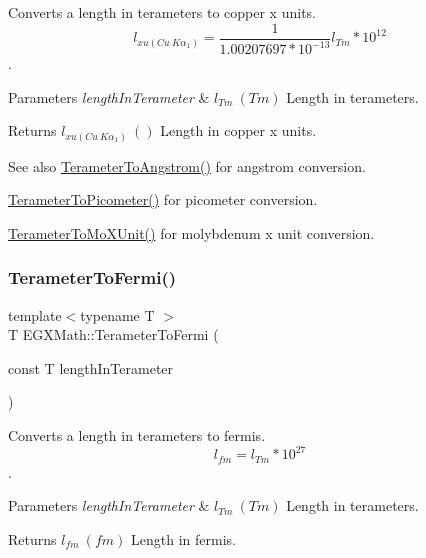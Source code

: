 Converts a length in terameters to copper x units. \[ l_{xu(Cu\ K\alpha_1)}= \frac{1}{1.00207697*10^{-13}} l_{Tm} * 10^{12}\]. 


\begin{DoxyParams}{Parameters}
{\em length\+In\+Terameter} & $ l_{Tm}\ (Tm)$ Length in terameters. \\
\hline
\end{DoxyParams}
\begin{DoxyReturn}{Returns}
$ l_{xu(Cu\ K\alpha_1)}\ ()$ Length in copper x units. 
\end{DoxyReturn}
\begin{DoxySeeAlso}{See also}
\mbox{\hyperlink{group___e_g_x_math-_conversions-_length_conversions-_s_i-_terameter-_non-_s_i_gaab75399e224bea4ea7ddb8bf5f557ee0}{Terameter\+To\+Angstrom()}} for angstrom conversion. 

\mbox{\hyperlink{group___e_g_x_math-_conversions-_length_conversions-_s_i-_terameter-_s_i_ga131f3ccf4db05a31f5bd5c9487da9a4e}{Terameter\+To\+Picometer()}} for picometer conversion. 

\mbox{\hyperlink{group___e_g_x_math-_conversions-_length_conversions-_s_i-_terameter-_non-_s_i_ga391bcf9b529c2e20f2773c699bb0197a}{Terameter\+To\+Mo\+X\+Unit()}} for molybdenum x unit conversion. 
\end{DoxySeeAlso}
\mbox{\label{group___e_g_x_math-_conversions-_length_conversions-_s_i-_terameter-_non-_s_i_ga5bf639553e4b6e8520f9345def06e492}} 
\subsubsection{\texorpdfstring{Terameter\+To\+Fermi()}{TerameterToFermi()}}
{\footnotesize\ttfamily template$<$typename T $>$ \\
T E\+G\+X\+Math\+::\+Terameter\+To\+Fermi (\begin{DoxyParamCaption}\item[{const T}]{length\+In\+Terameter }\end{DoxyParamCaption})}



Converts a length in terameters to fermis. \[ l_{fm}=l_{Tm} * 10^{27} \]. 


\begin{DoxyParams}{Parameters}
{\em length\+In\+Terameter} & $ l_{Tm}\ (Tm)$ Length in terameters. \\
\hline
\end{DoxyParams}
\begin{DoxyReturn}{Returns}
$ l_{fm}\ (fm)$ Length in fermis. 
\end{DoxyReturn}
\mbox{\label{group___e_g_x_math-_conversions-_length_conversions-_s_i-_terameter-_non-_s_i_gaa5fdc4aaf15e6428cf443e3d808403a3}} 
